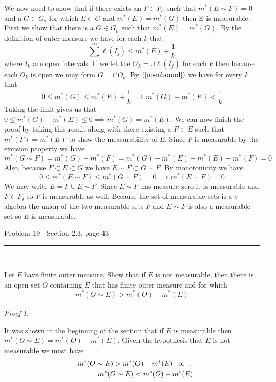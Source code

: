 \documentclass[11pt,reqno]{article}
\begin{document}
We now need to show that if there exists an $F \in F_\sigma$ such that $m^*(E \sim F) = 0$ and a $G \in G_\sigma$ for which $E \subset G$ and $m^*(E) = m^*(G)$ then E is measurable. First we show that there is a $G \in G_\sigma$ such that $m^*(E) = m^*(G)$. By the definition of outer measure we have for each $k$ that
\[ \sum^\infty \ell(I_j) \le m^*(E) + \frac{1}{k} \]
where $I_k$ are open intervals. If we let the $O_k = \cup \ell(I_j)$ for each $k$ then because each $O_k$ is open we may form $G = \cap O_k$. By $(\ref{openbound})$ we have for every $k$ that
\[ 0 \le m^*(G) \le m^*(E) + \frac{1}{k} \implies m^*(G) - m^*(E) < \frac{1}{k} \]
Taking the limit gives us that $0 \le m^*(G) - m^*(E) \le 0 \implies m^*(G) = m^*(E)$. We can now finish the proof by taking this result along with there existing a $F \subset E$ such that $m^*(F) = m^*(E)$ to show the measurability of $E$.
Since $F$ is measurable by the excision property we have
\[ m^*(G \sim F) = m^*(G) - m^*(F) = m^*(G) - m^*(E) + m^*(E) - m^*(F) = 0 \]
Also, because $F \subset E \subset G$ we have $E \sim F \subset G \sim F$. By monotonicity we have 
\[ 0 \le m^*(E \sim F) \le m^*(G \sim F) = 0  \implies m^*(E \sim F) = 0\] 
We may write $E = F \cup E \sim F$. Since $E \sim F$ has measure zero it is measurable and $F \in F_\delta$ so $F$ is measurable as well. Because the set of measurable sets is a $\sigma$-algebra the union of the two measurable sets $F$ and $E \sim F$ is also a measurable set so $E$ is measurable.

\begin{flushleft} 
Problem 19 - Section 2.3, page 43\\
\rule{500pt}{1pt}\\
\end{flushleft} 

Let $E$ have finite outer measure. Show that if $E$ is not measurable, then there is an open set $O$ containing $E$ that has finite outer measure and for which 
\[ m^*(O \sim E) > m^*(O) - m^*(E) \]
\\ \emph{Proof 1.}

It was shown in the beginning of the section that if $E$ is measurable then $m^*(O \sim E) = m^*(O) - m^*(E)$. Given the hypothesis that $E$ is not measurable we must have
\begin{eqnarray}
&&m^*(O \sim E) > m^*(O) - m^*(E) \hspace{8px} \text{or ...} \label{measurediffgreat}\\
&&m^*(O \sim E) < m^*(O) - m^*(E) \label{measurediffless}
\end{eqnarray}
\end{document}
